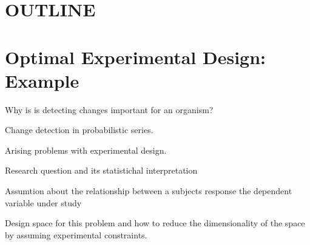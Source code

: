 \documentclass[preprint,review,12pt]{elsarticle}
\begin{document}
\section{OUTLINE}





\section{Optimal Experimental Design: Example}
\label{S:2}

Why is is detecting changes important for an organism?

Change detection in probabilistic series.

Arising problems with experimental design.

Research question and its statistichal interpretation

Assumtion about the relationship between a subjects response the dependent variable under study

Design space for this problem and how to reduce the dimensionality of the space by assuming experimental constraints.
\end{document}
